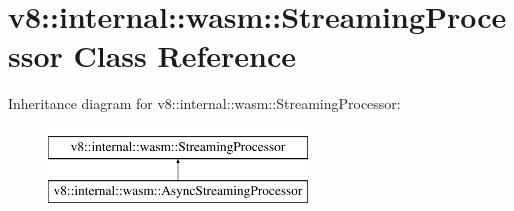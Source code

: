 \hypertarget{classv8_1_1internal_1_1wasm_1_1StreamingProcessor}{}\section{v8\+:\+:internal\+:\+:wasm\+:\+:Streaming\+Processor Class Reference}
\label{classv8_1_1internal_1_1wasm_1_1StreamingProcessor}
Inheritance diagram for v8\+:\+:internal\+:\+:wasm\+:\+:Streaming\+Processor\+:\begin{figure}[H]
\begin{center}
\leavevmode
\includegraphics[height=2.000000cm]{classv8_1_1internal_1_1wasm_1_1StreamingProcessor}
\end{center}
\end{figure}
